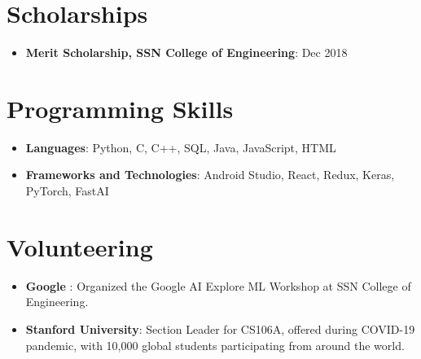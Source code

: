 \documentclass[letterpaper,11pt]{article}
\newcommand{\resumeItem}[2]{
  \item\small{
    \textbf{#1}{: #2 \vspace{-2pt}}
  }
}
\newcommand{\resumeSubItem}[2]{\resumeItem{#1}{#2}\vspace{-4pt}}
\newcommand{\resumeSubHeadingListStart}{\begin{itemize}[leftmargin=*]}
\newcommand{\resumeSubHeadingListEnd}{\end{itemize}}
\begin{document}
\section{Scholarships}
  \resumeSubHeadingListStart
      \resumeSubItem
  {Merit Scholarship, SSN College of Engineering}{Dec 2018}
\resumeSubHeadingListEnd

\iffalse
\section{Certifications}
  \resumeSubHeadingListStart
        \resumeSubItem
  {Natural Language Processing with Tensorflow, deeplearning.ai}{July 2019}
        \resumeSubItem
  {Neural Networks and Deep Learning, deeplearning.ai (Scholarship)}{Mar 2019}
      \resumeSubItem
  {Introduction to TensorFlow for AI, ML and DL, deeplearning.ai (Scholarship)}{Mar 2019}
    \resumeSubItem
      {Data Science Foundations - Level 2, IBM}{Jan 2019}
    \resumeSubItem
  {Machine Learning, Stanford University (Scholarship)}{Apr 2018}
    \resumeSubItem
  {Introduction to Mathematical Thinking, Stanford University (Scholarship)}{Jan 2018} 	
\resumeSubHeadingListEnd
\fi

\section{Programming Skills}
  \resumeSubHeadingListStart
   \item{
     \textbf{Languages}{: Python, C, C++, SQL, Java, JavaScript, HTML}
      }
      \item{
       \textbf{Frameworks and Technologies}{: Android Studio, React, Redux, Keras, PyTorch, FastAI}
    }
  \resumeSubHeadingListEnd

\section{Volunteering}
\resumeSubHeadingListStart
\resumeItem{Google }{Organized the Google AI Explore ML Workshop at SSN College of Engineering.}
\resumeItem{Stanford University}{Section Leader for CS106A, offered during COVID-19 pandemic, with 10,000 global students participating from around the world.}
\resumeSubHeadingListEnd
\iffalse
\section{Blog}
I also run a blog which you can find at \href{https://rohitmidha23.github.io/blog}{rohitmidha23.github.io/blog}. It has had over 30k page views.
\fi
\end{document}
